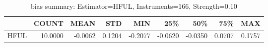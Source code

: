 \begin{table}[ht]
\centering
\caption{bias summary: Estimator=HFUL, Instruments=166, Strength=0.10}
\begin{tabular}{lrrrrrrrr}
\toprule
 & COUNT & MEAN & STD & MIN & 25\% & 50\% & 75\% & MAX \\
\midrule
HFUL & 10.0000 & -0.0062 & 0.1204 & -0.2077 & -0.0620 & -0.0350 & 0.0707 & 0.1757 \\
\bottomrule
\end{tabular}
\end{table}
